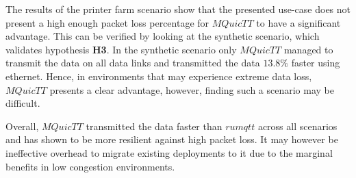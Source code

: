 The results of the printer farm scenario show that the presented use-case does not present a high enough packet loss percentage for $MQuicTT$ to have a significant advantage.
This can be verified by looking at the synthetic scenario, which validates hypothesis \textbf{H3}.
In the synthetic scenario only $MQuicTT$ managed to transmit the data on all data links and transmitted the data $13.8\%$ faster using ethernet.
Hence, in environments that may experience extreme data loss, $MQuicTT$ presents a clear advantage, however, finding such a scenario may be difficult.

Overall, $MQuicTT$ transmitted the data faster than $rumqtt$ across all scenarios and has shown to be more resilient against high packet loss.
It may however be ineffective overhead to migrate existing deployments to it due to the marginal benefits in low congestion environments.